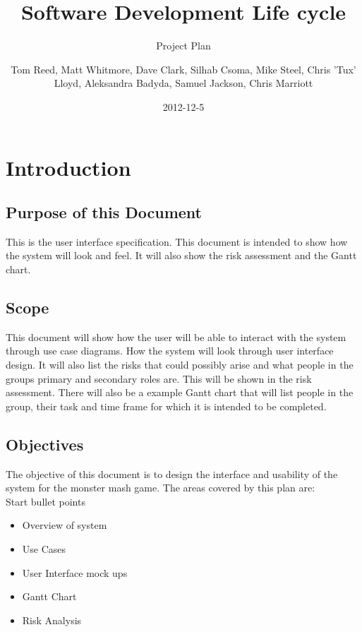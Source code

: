 \documentclass{project}
\begin{document}
\title{Software Development Life cycle}
\subtitle{Project Plan}
\author{Tom Reed, Matt Whitmore, Dave Clark, Silhab Csoma, Mike Steel, Chris 'Tux' Lloyd, Aleksandra Badyda, Samuel Jackson, Chris Marriott}
\date{2012-12-5}
\maketitle
\tableofcontents
\newpage
\section{Introduction}
\subsection{Purpose of this Document}
This is the user interface specification. This document is intended to show how the system will look and feel. It will also show the risk assessment and the Gantt chart.
\subsection{Scope}
This document will show how the user will be able to interact with the system
through use case diagrams. How the system will look through user interface design.
It will also list the risks that could possibly arise and what people in the groups
primary and secondary roles are. This will be shown in the risk assessment. There
will also be a example Gantt chart that will list people in the group, their task and
time frame for which it is intended to be completed.

\subsection{Objectives}
The objective of this document is to design the interface and usability of the system
for the monster mash game.
The areas covered by this plan are:
\\
Start bullet points
\begin{itemize}
	\item Overview of system
	\item Use Cases
	\item User Interface mock ups
	\item Gantt Chart
	\item Risk Analysis
\end{itemize}
\end{document}
